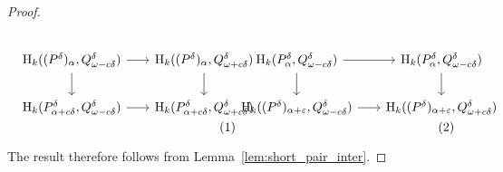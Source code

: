 \begin{proof}
\begin{scriptsize}
  \vspace{3ex}\begin{subequations}
  \begin{minipage}{0.5\textwidth}\begin{equation}\label{dgm:fabgcd}
  \begin{tikzcd}[column sep=scriptsize]
    \hom_k((\P)_\alpha, \Q^\delta)\arrow{r}\arrow{d} &
    \hom_k((\P)_\alpha, \QQ^\delta)\arrow{d}\\
    \hom_k(\P_{\alpha+c\delta}, \Q^\of)\arrow{r}&
    \hom_k(\P_{\alpha+c\delta}, \QQ^\of)
  \end{tikzcd}\end{equation}\end{minipage}
  \begin{minipage}{0.5\textwidth}\begin{equation}\label{dgm:gcdfab}
  \begin{tikzcd}[column sep=scriptsize]
    \hom_k(\P_\alpha, \Q^\of)\arrow{r}\arrow{d} &
    \hom_k(\P_\alpha, \Q^\of)\arrow{d}\\
    \hom_k((\P)_{\alpha+\e}, \Q^\delta)\arrow{r} &
    \hom_k((\P)_{\alpha+\e}, \QQ^\delta)
  \end{tikzcd}\end{equation}\end{minipage}
  \end{subequations}\vspace{3ex}
  \end{scriptsize}

  The result therefore follows from Lemma~\ref{lem:short_pair_inter}.
\end{proof}

